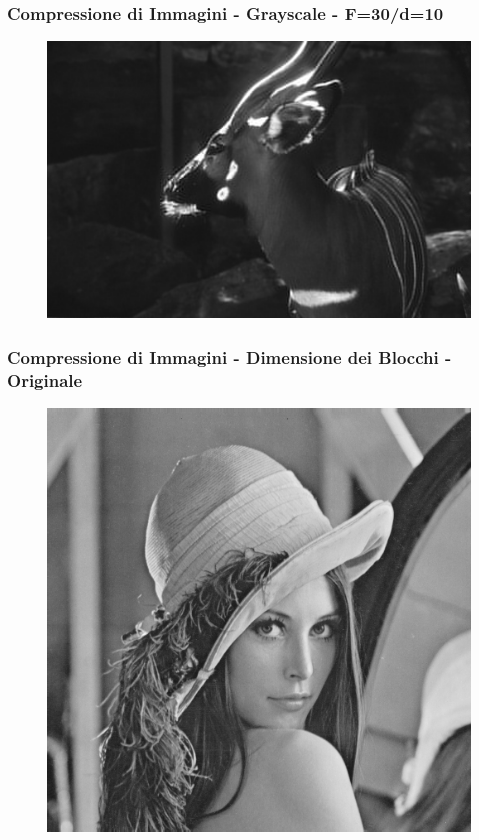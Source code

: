 \documentclass{beamer}
\begin{document}
\begin{frame}
\frametitle{Compressione di Immagini - Grayscale - F=30/d=10}
\begin{figure}
  \centering
  \includegraphics[width=\linewidth]{images/compression-gs-F30-d10.png}
\end{figure}
\end{frame}

\begin{frame}
\frametitle{Compressione di Immagini - Dimensione dei Blocchi - Originale}
\begin{figure}
  \centering
  \includegraphics[width=0.58\linewidth]{images/compression-gb-original.png}
\end{figure}
\end{frame}
\end{document}
